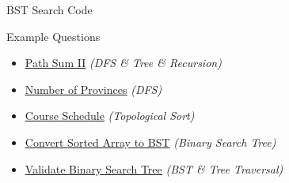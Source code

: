 \documentclass[aspectratio=169]{beamer}%
\begin{document}
\begin{frame}{BST Search Code}
    
\end{frame}

\begin{frame}{Example Questions}
    \begin{itemize}
        \item \href{https://leetcode.com/submissions/detail/761526188/}{\underline{Path Sum II}} \emph{(DFS \& Tree \& Recursion)}
        \item \href{https://leetcode.com/submissions/detail/761730196/}{\underline{Number of Provinces}} \emph{(DFS)}
        \item \href{https://leetcode.com/submissions/detail/811277616/}{\underline{Course Schedule}} \emph{(Topological Sort)}
        \item \href{https://leetcode.com/submissions/detail/751458695/}{\underline{Convert Sorted Array to BST}} \emph{(Binary Search Tree)}
        \item \href{https://leetcode.com/submissions/detail/787225539/}{\underline{Validate Binary Search Tree}} \emph{(BST \& Tree Traversal)}
    \end{itemize}
\end{frame}
\end{document}
